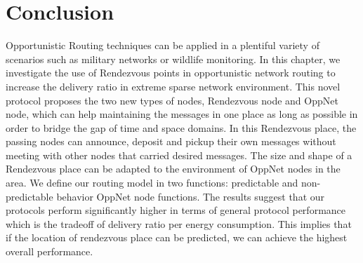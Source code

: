 \section{Conclusion}
\label{DRRA:Conclusion}

Opportunistic Routing techniques can be applied in a plentiful variety of scenarios such as military networks or wildlife monitoring. 
%
In this chapter, we investigate the use of Rendezvous points in opportunistic network routing to increase the delivery ratio in extreme sparse network environment.
%
This novel protocol proposes the two new types of nodes, Rendezvous node and OppNet node, which can help maintaining the messages in one place as long as possible in order to bridge the gap of time and space domains.
%
In this Rendezvous place, the passing nodes can announce, deposit and pickup their own messages without meeting with other nodes that carried desired messages.
%
The size and shape of a Rendezvous place can be adapted to the environment of OppNet nodes in the area.
%
We define our routing model in two functions: predictable  and non-predictable behavior OppNet node functions.
%
The results suggest that our protocols perform significantly higher in terms of general protocol performance which is the tradeoff of delivery ratio per energy consumption.
%
This implies that if the location of rendezvous place can be predicted, we can achieve the highest overall performance.


